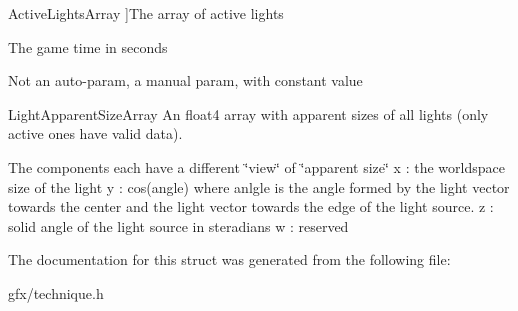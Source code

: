 \begin{Desc}
\begin{description}
{Active\+Lights\+Array\hypertarget{structTechnique_1_1Pass_1_1ShaderParam_adfc05401be5223ca462814070a09c776a9ec7c128ec7ad859c2ebb193c4e886e3}{}\label{structTechnique_1_1Pass_1_1ShaderParam_adfc05401be5223ca462814070a09c776a9ec7c128ec7ad859c2ebb193c4e886e3}
}]The array of active lights \item[{\em 
Game\+Time\hypertarget{structTechnique_1_1Pass_1_1ShaderParam_adfc05401be5223ca462814070a09c776a42e3a2c6c6a166d535623744f87e2b02}{}\label{structTechnique_1_1Pass_1_1ShaderParam_adfc05401be5223ca462814070a09c776a42e3a2c6c6a166d535623744f87e2b02}
}]The game time in seconds \item[{\em 
Constant\hypertarget{structTechnique_1_1Pass_1_1ShaderParam_adfc05401be5223ca462814070a09c776ac1da13b1e238f82638e82fc9ce74a776}{}\label{structTechnique_1_1Pass_1_1ShaderParam_adfc05401be5223ca462814070a09c776ac1da13b1e238f82638e82fc9ce74a776}
}]Not an auto-\/param, a manual param, with constant value \item[{\em 
Apparent\+Light\+Size\+Array\hypertarget{structTechnique_1_1Pass_1_1ShaderParam_adfc05401be5223ca462814070a09c776a1a531c384f1d5e13ec5736a77a7ffc01}{}\label{structTechnique_1_1Pass_1_1ShaderParam_adfc05401be5223ca462814070a09c776a1a531c384f1d5e13ec5736a77a7ffc01}
}]Light\+Apparent\+Size\+Array An float4 array with apparent sizes of all lights (only active ones have valid data).

The components each have a different \char`\"{}view\char`\"{} of \char`\"{}apparent size\char`\"{} x \+: the worldspace size of the light y \+: cos(angle) where anlgle is the angle formed by the light vector towards the center and the light vector towards the edge of the light source. z \+: solid angle of the light source in steradians w \+: reserved \end{description}
\end{Desc}


The documentation for this struct was generated from the following file\+:\begin{DoxyCompactItemize}
\item 
gfx/technique.\+h\end{DoxyCompactItemize}
